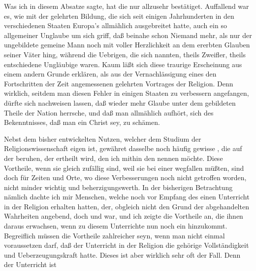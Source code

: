 \begin{aufza}
\begin{aufzb}
\end{aufzb}
\begin{RWanm}
Was ich in diesem Absatze sagte, hat die  nur allzusehr bestätiget. Auffallend war es, wie mit der gelehrten Bildung, die sich seit einigen Jahrhunderten in den verschiedenen Staaten Europa's allmählich ausgebreitet hatte, auch ein so allgemeiner Unglaube um sich griff, daß beinahe schon Niemand mehr, als nur der ungebildete gemeine Mann noch mit voller Herzlichkeit an dem ererbten Glauben seiner Väter hing, während die Uebrigen, die sich  nannten, theils Zweifler, theils entschiedene Ungläubige waren. Kaum läßt sich diese traurige Erscheinung aus einem andern Grunde erklären, als aus der Vernachlässigung eines den Fortschritten der Zeit angemessenen gelehrten Vortrages der Religion. Denn wirklich, seitdem man diesen Fehler in einigen Staaten zu verbessern angefangen, dürfte sich nachweisen lassen, daß wieder mehr Glaube unter dem gebildeten Theile der Nation herrsche, und daß man allmählich aufhört, sich des Bekenntnisses, daß man ein Christ sey, zu schämen.
\end{RWanm}
\item Nebst dem bisher entwickelten Nutzen, welcher dem Studium der Religionswissenschaft  eigen ist, gewähret dasselbe noch häufig gewisse , die auf der  beruhen, der  ertheilt wird, den ich mithin den  nennen möchte. Diese Vortheile, wenn sie gleich zufällig sind, weil sie bei einer  wegfallen müßten, sind doch für Zeiten und Orte, wo diese Verbesserungen noch nicht getroffen worden, nicht minder wichtig und beherzigungswerth. In der bisherigen Betrachtung nämlich dachte ich mir Menschen, welche noch vor Empfang des  einen  Unterricht in der Religion erhalten hatten, der, obgleich nicht den Grund der abgehandelten Wahrheiten angebend, doch  und  war, und ich zeigte die Vortheile an, die ihnen daraus erwachsen, wenn zu diesem  Unterrichte nun noch ein  hinzukommt. Begreiflich müssen die Vortheile zahlreicher seyn, wenn man nicht einmal voraussetzen darf, daß der  Unterricht in der Religion die gehörige Vollständigkeit und Ueberzeugungskraft hatte. Dieses ist aber wirklich sehr oft der Fall. Denn der  Unterricht ist

\end{aufza}
